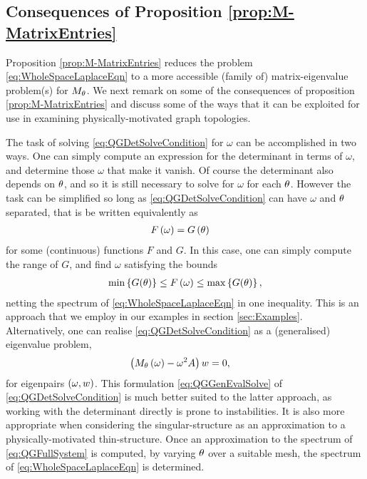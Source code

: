 \subsection{Consequences of Proposition \ref{prop:M-MatrixEntries}} \label{ssec:MMatrixConsequences}
Proposition \ref{prop:M-MatrixEntries} reduces the problem \eqref{eq:WholeSpaceLaplaceEqn} to a more accessible (family of) matrix-eigenvalue problem(s) for $M_\theta$.
We next remark on some of the consequences of proposition \ref{prop:M-MatrixEntries} and discuss some of the ways that it can be exploited for use in examining physically-motivated graph topologies.

The task of solving \eqref{eq:QGDetSolveCondition} for $\omega$ can be accomplished in two ways.
One can simply compute an expression for the determinant in terms of $\omega$, and determine those $\omega$ that make it vanish.
Of course the determinant also depends on $\theta$, and so it is still necessary to solve for $\omega$ for each $\theta$.
However the task can be simplified so long as \eqref{eq:QGDetSolveCondition} can have $\omega$ and $\theta$ separated, that is be written equivalently as
\begin{align*}
	F\left( \omega \right) &= G\left( \theta \right)
\end{align*}
for some (continuous) functions $F$ and $G$.
In this case, one can simply compute the range of $G$, and find $\omega$ satisfying the bounds
\begin{align*}
	\min\left\{ G(\theta) \right\} \leq F\left( \omega \right) \leq \max\left\{ G(\theta) \right\},
\end{align*}
netting the spectrum of \eqref{eq:WholeSpaceLaplaceEqn} in one inequality.
This is an approach that we employ in our examples in section \ref{sec:Examples}.
Alternatively, one can realise \eqref{eq:QGDetSolveCondition} as a (generalised) eigenvalue problem,
\begin{align} \label{eq:QGGenEvalSolve}
	\left(  M_\theta\left( \omega \right)-\omega^2 A  \right)w &= 0,
\end{align}
for eigenpairs $\left( \omega, w \right)$.
This formulation \eqref{eq:QGGenEvalSolve} of \eqref{eq:QGDetSolveCondition} is much better suited to the latter approach, as working with the determinant directly is prone to instabilities.
It is also more appropriate when considering the singular-structure as an approximation to a physically-motivated thin-structure.
Once an approximation to the spectrum of \eqref{eq:QGFullSystem} is computed, by varying $\theta$ over a suitable mesh, the spectrum of \eqref{eq:WholeSpaceLaplaceEqn} is determined.

